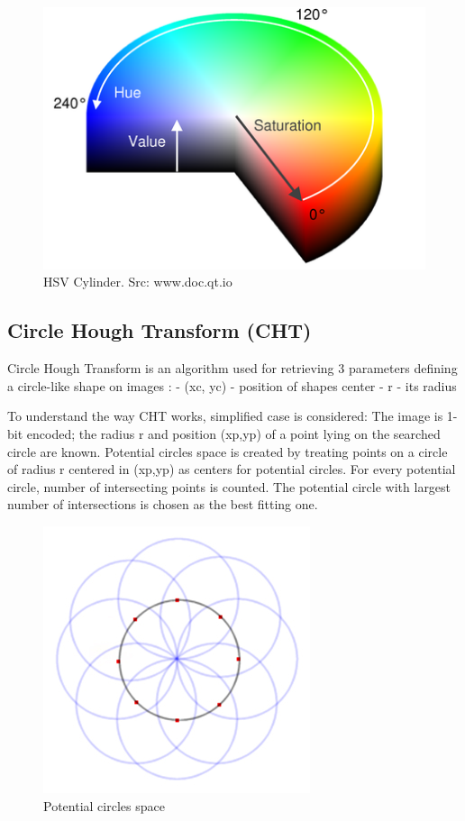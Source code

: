 \documentclass[12pt,twoside,a4paper]{article}
\begin{document}
\begin{figure}[H]
\centering
\includegraphics[width=0.4\paperwidth]{hsv}
\caption{HSV Cylinder. Src: www.doc.qt.io}
\end{figure}


\subsection{Circle Hough Transform (CHT)}
Circle Hough Transform is an algorithm used for retrieving 3 parameters defining a circle-like shape on images\cite{hgtcv} : 
- (xc, yc) - position of shapes center
- r - its radius

To understand the way CHT works, simplified case is considered:
The image is 1-bit encoded; the radius r and position (xp,yp) of a point lying on the searched circle are known.
Potential circles space is created by treating points on a circle of radius r centered in (xp,yp) as centers for potential circles.
For every potential circle, number of intersecting points is counted.
The potential circle with largest number of intersections is chosen as the best fitting one.

 
\begin{figure}[H]
\centering
\includegraphics[width=0.4\paperwidth]{space}
\caption{Potential circles space\cite{craters}}
\end{figure}
\end{document}

